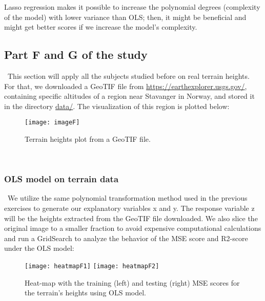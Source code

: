 Lasso regression makes it possible to increase the polynomial degrees (complexity of the model) with lower variance than OLS; then, it might be beneficial and might get better scores if we increase the model's complexity.\\

\subsection{Part F and G of the study}
\label{chap:Part F and G of the study}

\quad \, This section will apply all the subjects studied before on real terrain heights. For that, we downloaded a GeoTIF file from \href{https://earthexplorer.usgs.gov/}{https://earthexplorer.usgs.gov/}, containing specific altitudes of a region near Stavanger in Norway, and stored it in the directory \href{https://github.com/fabiorodp/UiO-FYS-STK4155/tree/master/Project1/data}{data/}. The visualization of this region is plotted below: \\

\begin{figure}[H]
\label{fig:imageF}
\centering
\texttt{[image: imageF]}
\caption{Terrain heights plot from a GeoTIF file.}
\end{figure}\\

\subsubsection{OLS model on terrain data}
\label{chap:OLS model on terrain data}

\quad \, We utilize the same polynomial transformation method used in the previous exercises to generate our explanatory variables x and y. The response variable z will be the heights extracted from the GeoTIF file downloaded. We also slice the original image to a smaller fraction to avoid expensive computational calculations and run a GridSearch to analyze the behavior of the MSE score and R2-score under the OLS model:\\

\begin{figure}[H]
\label{fig:heatmapF1and2}
\centering
\texttt{[image: heatmapF1]}
\texttt{[image: heatmapF2]}
\caption{Heat-map with the training (left) and testing (right) MSE scores for the terrain's heights using OLS model.}
\end{figure}\\

